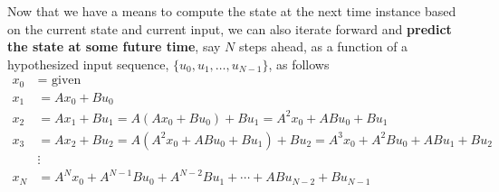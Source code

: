 Now that we have a means to compute the state at the next time instance based on the current state and current input, we can also iterate forward and \textbf{predict the state at some future time}, say $N$ steps ahead, as a function of a hypothesized input sequence, $\{u_0, u_1, \ldots, u_{N-1} \}$, as follows
\begin{align}
    x_0 &= \text{ given} \nonumber\\
    x_1 &= A x_0 + B u_0 \nonumber\\
    x_2 &= A x_1 + B u_1 = A(A x_0 + B u_0 ) + B u_1 = A^2 x_0 + A B u_0 + B u_1 \nonumber\\
    x_3 &= A x_2 + B u_2 = A(A^2 x_0 + A B u_0 + B u_1) + B u_2 = A^3 x_0 + A^2 B u_0 + A B u_1 + B u_2 \nonumber\\
    &\vdots \nonumber\\
    x_N &= A^N x_0 + A^{N-1} B u_0 + A^{N-2} B u_1 + \cdots + A B u_{N-2} + B u_{N-1} \label{eq:stateTransition_derive_init}
\end{align}

